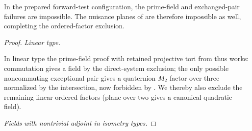 \begin{proposition}
\label{fb:field-pair-exclusion}
In the prepared forward-test configuration, the prime-field and exchanged-pair
failures are impossible.  The nuisance planes of 
are therefore impossible as well, completing the ordered-factor exclusion.
\end{proposition}
\begin{proof}
\noindent\emph{Linear type.}

In linear type the prime-field proof with retained projective tori from  thus works: commutation gives a field by the direct-system exclusion; the only possible noncommuting exceptional pair gives a quaternion \(M_2\) factor over three normalized by the intersection, now forbidden by . We thereby also exclude the remaining linear ordered factors (plane over two gives a canonical quadratic field).

\noindent\emph{Fields with nontrivial adjoint in isometry types.}


\end{proof}
